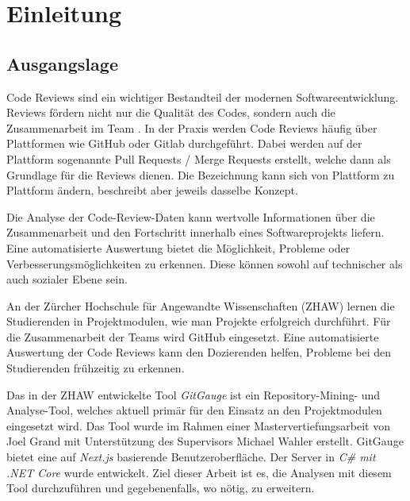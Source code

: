 


\chapter{Einleitung} %


\label{Chapter1} %


\section{Ausgangslage}
\label{sec:Ausgangslage} 
Code Reviews sind ein wichtiger Bestandteil der modernen Softwareentwicklung. Reviews fördern nicht nur die Qualität des Codes, sondern auch die Zusammenarbeit im Team \parencite{dos_santos_investigating_2018}. In der Praxis werden Code Reviews häufig über Plattformen wie GitHub oder Gitlab durchgeführt. Dabei werden auf der Plattform sogenannte Pull Requests / Merge Requests erstellt, welche dann als Grundlage für die Reviews dienen. Die Bezeichnung kann sich von Plattform zu Plattform ändern, beschreibt aber jeweils dasselbe Konzept. \parencite{kansab_analyzing_2025}


Die Analyse der Code-Review-Daten kann wertvolle Informationen über die Zusammenarbeit und den Fortschritt innerhalb eines Softwareprojekts liefern. Eine automatisierte Auswertung bietet die Möglichkeit, Probleme oder Verbesserungsmöglichkeiten zu erkennen. Diese können sowohl auf technischer als auch sozialer Ebene sein. 

An der Zürcher Hochschule für Angewandte Wissenschaften (ZHAW) lernen die Studierenden in Projektmodulen, wie man Projekte erfolgreich durchführt. Für die Zusammenarbeit der Teams wird GitHub eingesetzt. Eine automatisierte Auswertung der Code Reviews kann den Dozierenden helfen, Probleme bei den Studierenden frühzeitig zu erkennen.

Das in der ZHAW entwickelte Tool \textit{GitGauge} ist ein Repository-Mining- und Analyse-Tool, welches aktuell primär für den Einsatz an den Projektmodulen eingesetzt wird. Das Tool wurde im Rahmen einer Mastervertiefungsarbeit von Joel Grand mit Unterstützung des Supervisors Michael Wahler erstellt. GitGauge bietet eine auf \textit{Next.js} basierende Benutzeroberfläche. Der Server in \textit{C\# mit .NET Core } wurde entwickelt. Ziel dieser Arbeit ist es, die Analysen mit diesem Tool durchzuführen und gegebenenfalls, wo nötig, zu erweitern. \parencite{grand_joel_wahler_michael_waspe_lara_stumpf_simon_repo_nodate}

